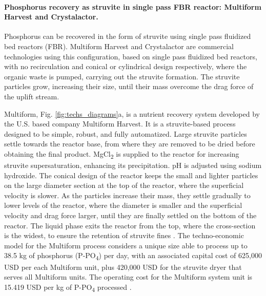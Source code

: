 \documentclass[10pt,a4paper]{article}
\begin{document}
\paragraph{Phosphorus recovery as struvite in single pass FBR reactor: Multiform Harvest and Crystalactor.}
Phosphorus can be recovered in the form of struvite using single pass fluidized bed reactors (FBR). Multiform Harvest and Crystalactor are commercial technologies using this configuration, based on single pass fluidized bed reactors, with no recirculation and conical or cylindrical design respectively, where the organic waste is pumped, carrying out the struvite formation. The struvite particles grow, increasing their size, until their mass overcome the drag force of the uplift stream.

Multiform, Fig. \ref{fig:techs_diagrams}a, is a nutrient recovery system developed by the U.S. based company Multiform Harvest. It is a struvite-based process designed to be simple, robust, and fully automatized. Large struvite particles settle towards the reactor base, from where they are removed to be dried before obtaining the final product. MgCl\textsubscript{2} is supplied to the reactor for increasing struvite supersaturation, enhancing its precipitation. pH is adjusted using sodium hydroxide. The conical design of the reactor keeps the small and lighter particles on the large diameter section at the top of the reactor, where the superficial velocity is slower. As the particles increase their mass, they settle gradually to lower levels of the reactor, where the diameter is smaller and the superficial velocity and drag force larger, until they are finally settled on the bottom of the reactor. The liquid phase exits the reactor from the top, where the cross-section is the widest, to ensure the retention of struvite fines .
The techno-economic model for the Multiform process considers a unique size able to process up to 38.5 kg of phosphorus (P-PO\textsubscript{4}) per day, with an associated capital cost of 625,000 USD per each Multiform unit, plus 420,000 USD for the struvite dryer that serves all Multiform units. The operating cost for the Multiform system unit is 15.419 USD per kg of P-PO\textsubscript{4} processed .
\end{document}
